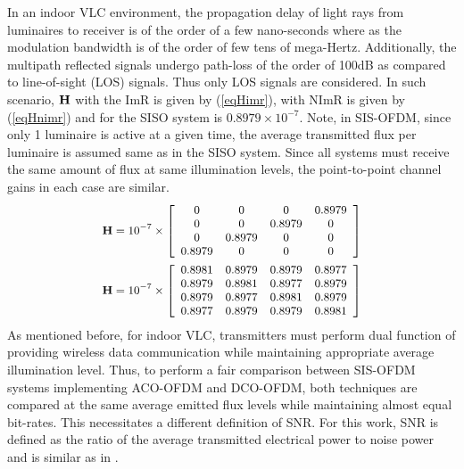 \documentclass[12pt,letterpaper,onecolumn]{article} %
\newcommand{\vm}[1]{{\bf{#1}}}
\begin{document}
In an indoor VLC environment, the propagation delay of light rays from luminaires to receiver is of the order of a few nano-seconds where as the modulation bandwidth is of the order of few tens of mega-Hertz. Additionally, the multipath reflected signals undergo path-loss of the order of 100dB as compared to line-of-sight (LOS) signals. Thus only LOS signals are considered. In such scenario, $\vm{H}$ with the ImR is given by (\ref{eqHimr}), with NImR is given by (\ref{eqHnimr}) and for the SISO system is $0.8979\times 10^{-7}$. Note, in SIS-OFDM, since only 1 luminaire is active at a given time, the average transmitted flux per luminaire is assumed same as in the SISO system. Since all systems must receive the same amount of flux at same illumination levels, the point-to-point channel gains in each case are similar.
\begin{subequations}
\small
\begin{align}
	\vm{H} = 10^{-7}\times\left[
	                      \begin{array}{cccc}
												0&0&0&0.8979\\
												0&0&0.8979&0\\
												0&0.8979&0&0\\
												0.8979&0&0&0
												\end{array}
												\right]\label{eqHimr}\\
	\vm{H} = 10^{-7}\times\left[
	                      \begin{array}{cccc}
												0.8981&0.8979&0.8979&0.8977\\
												0.8979&0.8981&0.8977&0.8979\\
												0.8979&0.8977&0.8981&0.8979\\
												0.8977&0.8979&0.8979&0.8981
												\end{array}
												\right]\label{eqHnimr}
\end{align}
\label{eqH}
\end{subequations}
As mentioned before, for indoor VLC, transmitters must perform dual function of providing wireless data communication while maintaining appropriate average illumination level. Thus, to perform a fair comparison between SIS-OFDM systems implementing ACO-OFDM and DCO-OFDM, both techniques are compared at the same average emitted flux levels while maintaining almost equal bit-rates. This necessitates a different definition of SNR. For this work, SNR is defined as the ratio of the average transmitted electrical power to noise power and is similar as in \cite{fat13a}.
\end{document}
